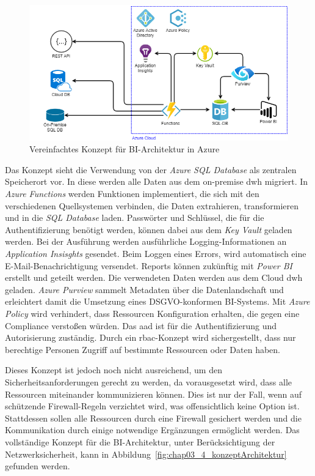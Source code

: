 \begin{figure}[htbp]
 \centering
 \includegraphics[width=\textwidth]{gfx/konzept_1.png}
 \caption{Vereinfachtes Konzept für BI-Architektur in Azure}
\label{fig:chap03_4_konzeptArchitektur_offen}
\end{figure}

Das Konzept sieht die Verwendung von der \textit{Azure SQL Database} als zentralen Speicherort vor. In diese werden alle Daten aus dem on-premise \ac{dwh} migriert. In \textit{Azure Functions} werden Funktionen implementiert, die sich mit den verschiedenen Quellsystemen verbinden, die Daten extrahieren, transformieren und in die \textit{SQL Database} laden. Passwörter und Schlüssel, die für die Authentifizierung benötigt werden, können dabei aus dem \textit{Key Vault} geladen werden. Bei der Ausführung werden ausführliche Logging-Informationen an \textit{Application Insisghts} gesendet. Beim Loggen eines Errors, wird automatisch eine E-Mail-Benachrichtigung versendet. Reports können zukünftig mit \textit{Power BI} erstellt und geteilt werden. Die verwendeten Daten werden aus dem Cloud \ac{dwh} geladen. \textit{Azure Purview} sammelt Metadaten über die Datenlandschaft und erleichtert damit die Umsetzung eines DSGVO-konformen BI-Systems. Mit \textit{Azure Policy} wird verhindert, dass Ressourcen Konfiguration erhalten, die gegen eine Compliance verstoßen würden. Das \ac{aad} ist für die Authentifizierung und Autorisierung zuständig. Durch ein \ac{rbac}-Konzept wird sichergestellt, dass nur berechtige Personen Zugriff auf bestimmte Ressourcen oder Daten haben. 

Dieses Konzept ist jedoch noch nicht ausreichend, um den Sicherheitsanforderungen gerecht zu werden, da vorausgesetzt wird, dass alle Ressourcen miteinander kommunizieren können. Dies ist nur der Fall, wenn auf schützende Firewall-Regeln verzichtet wird, was offensichtlich keine Option ist. Stattdessen sollen alle Ressourcen durch eine Firewall gesichert werden und die Kommunikation durch einige notwendige Ergänzungen ermöglicht werden. Das vollständige Konzept für die BI-Architektur, unter Berücksichtigung der Netzwerksicherheit, kann in Abbildung~\ref{fig:chap03_4_konzeptArchitektur} gefunden werden.
 
